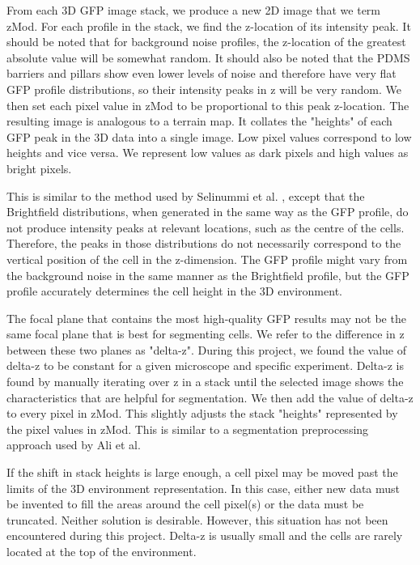 From each 3D GFP image stack, we produce a new 2D image that we term zMod. For each profile in the stack, we find the z-location of its intensity peak. It should be noted that for background noise profiles, the z-location of the greatest absolute value will be somewhat random. It should also be noted that the PDMS barriers and pillars show even lower levels of noise and therefore have very flat GFP profile distributions, so their intensity peaks in z will be very random. We then set each pixel value in zMod to be proportional to this peak z-location. The resulting image is analogous to a terrain map. It collates the "heights" of each GFP peak in the 3D data into a single image. Low pixel values correspond to low heights and vice versa. We represent low values as dark pixels and high values as bright pixels.

This is similar to the method used by Selinummi et al. , except that the Brightfield distributions, when generated in the same way as the GFP profile, do not produce intensity peaks at relevant locations, such as the centre of the cells. Therefore, the peaks in those distributions do not necessarily correspond to the vertical position of the cell in the z-dimension. The GFP profile might vary from the background noise in the same manner as the Brightfield profile, but the GFP profile accurately determines the cell height in the 3D environment.

The focal plane that contains the most high-quality GFP results may not be the same focal plane that is best for segmenting cells. We refer to the difference in z between these two planes as "delta-z". During this project, we found the value of delta-z to be constant for a given microscope and specific experiment. Delta-z is found by manually iterating over z in a stack until the selected image shows the characteristics that are helpful for segmentation. We then add the value of delta-z to every pixel in zMod. This slightly adjusts the stack "heights" represented by the pixel values in zMod. This is similar to a segmentation preprocessing approach used by Ali et al.~\cite{ali}

If the shift in stack heights is large enough, a cell pixel may be moved past the limits of the 3D environment representation. In this case, either new data must be invented to fill the areas around the cell pixel(s) or the data must be truncated. Neither solution is desirable. However, this situation has not been encountered during this project. Delta-z is usually small and the cells are rarely located at the top of the environment.

